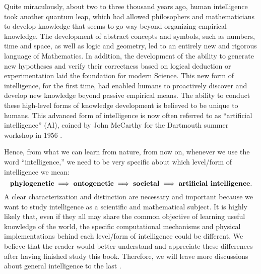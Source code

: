 \documentclass[../../book-main.tex]{subfiles}
\begin{document}
Quite miraculously, about two to three  thousand years ago, human intelligence took another quantum leap, which had allowed philosophers and mathematicians to develop knowledge that seems to go way beyond organizing empirical knowledge. The development of abstract concepts and symbols, such as numbers, time and space, as well as logic and geometry, led to an entirely new and rigorous language of Mathematics. In addition, the development of the ability to generate new hypotheses and verify their correctness based on logical deduction or experimentation laid the foundation for modern Science. This new form of intelligence, for the first time, had enabled humans to proactively discover and develop new knowledge beyond passive empirical means. The ability to conduct these high-level forms of knowledge development is believed to be unique to humans. This advanced form of intelligence is now often referred to as  ``artificial intelligence'' (AI), coined by John McCarthy for the Dartmouth summer workshop in 1956 \cite{McCarthy-1955}. 

Hence, from what we can learn from nature, from now on, whenever we use the word ``intelligence,'' we need to be very specific about which level/form of intelligence we mean:
\begin{equation}
\mbox{\textbf{phylogenetic}} \;
   \Longrightarrow \; \mbox{\textbf{ontogenetic}} \; \Longrightarrow \; 
   \mbox{\textbf{societal}}
   \; \Longrightarrow \; 
   \mbox{\textbf{artificial intelligence}}.
\end{equation}
A clear characterization and distinction are necessary and important because we want to study intelligence as a scientific and mathematical subject. It is highly likely that, even if they all may share the common objective of learning useful knowledge of the world, the specific computational mechanisms and physical implementations behind each level/form of intelligence could be different. We believe that the reader would better understand and appreciate these differences after having finished study this book. Therefore, we will leave more discussions about general intelligence to the last .
\end{document}
